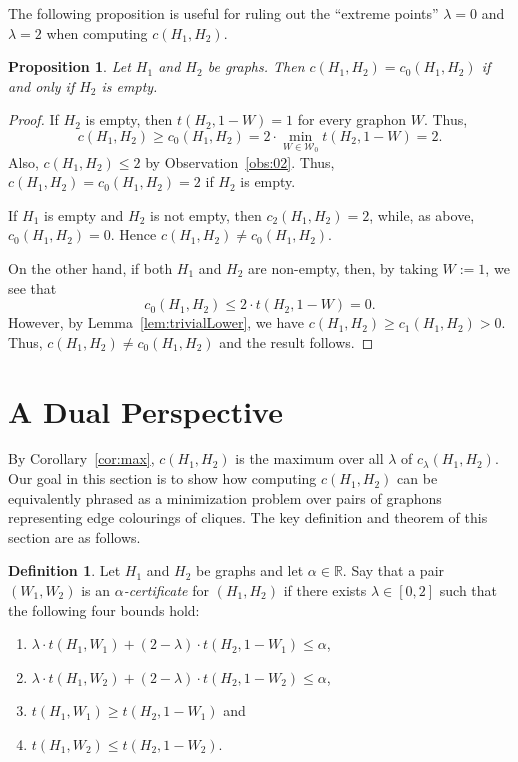 \documentclass[12pt]{article}
\numberwithin{equation}{section}
\newtheorem{prop}[equation]{Proposition}
\theoremstyle{definition}
\newtheorem{defn}[equation]{Definition}
\theoremstyle{remark}
\begin{document}
The following proposition is useful for ruling out the ``extreme points'' $\lambda=0$ and $\lambda=2$ when computing $c(H_1,H_2)$.

\begin{prop}
\label{prop:nonempty}
Let $H_1$ and $H_2$ be graphs. Then $c(H_1,H_2)=c_0(H_1,H_2)$ if and only if $H_2$ is empty. 
\end{prop}

\begin{proof}
If $H_2$ is empty, then $t(H_2,1-W)=1$ for every graphon $W$. Thus, 
\[c(H_1,H_2)\geq c_0(H_1,H_2)=2\cdot \min_{W\in\mathcal{W}_0}t(H_2,1-W) = 2.\]
Also, $c(H_1,H_2)\leq 2$ by Observation~\ref{obs:02}. Thus, $c(H_1,H_2)=c_0(H_1,H_2)=2$ if $H_2$ is empty. 

If $H_1$ is empty and $H_2$ is not empty, then $c_2(H_1,H_2)=2$, while, as above, $c_0(H_1,H_2)=0$. Hence $c(H_1,H_2)\neq c_0(H_1,H_2)$.

On the other hand, if both $H_1$ and $H_2$ are non-empty, then, by taking $W:=1$, we see that
\[c_0(H_1,H_2)\leq 2\cdot t(H_2,1-W) = 0.\]
However, by Lemma~\ref{lem:trivialLower}, we have $c(H_1,H_2)\geq c_1(H_1,H_2)>0$. Thus, $c(H_1,H_2)\neq c_0(H_1,H_2)$ and the result follows. 
\end{proof}

\section{A Dual Perspective}
\label{sec:dual}

By Corollary~\ref{cor:max}, $c(H_1,H_2)$ is the maximum over all $\lambda$ of $c_\lambda(H_1,H_2)$. Our goal in this section is to show how computing $c(H_1,H_2)$ can be equivalently phrased as a minimization problem over pairs of graphons representing edge colourings of cliques. The key definition and theorem of this section are as follows.

\begin{defn}
\label{defn:certificate}
Let $H_1$ and $H_2$ be graphs and let $\alpha\in\mathbb{R}$. Say that a pair $(W_1,W_2)$ is an \emph{$\alpha$-certificate} for $(H_1,H_2)$ if there exists $\lambda\in[0,2]$ such that the following four bounds hold:
\begin{enumerate}
 \item\label{eq:ralpha} $\lambda\cdot t(H_1,W_1) + (2-\lambda)\cdot t(H_2,1-W_1) \leq \alpha$,
 \item\label{eq:balpha} $\lambda\cdot t(H_1,W_2) + (2-\lambda)\cdot t(H_2,1-W_2) \leq \alpha$,
 \item\label{eq:rbigger}$t(H_1,W_1)\geq t(H_2,1-W_1)$ and
 \item\label{eq:bbigger} $t(H_1,W_2)\leq t(H_2,1-W_2)$.
\end{enumerate}
\end{defn}
\end{document}
